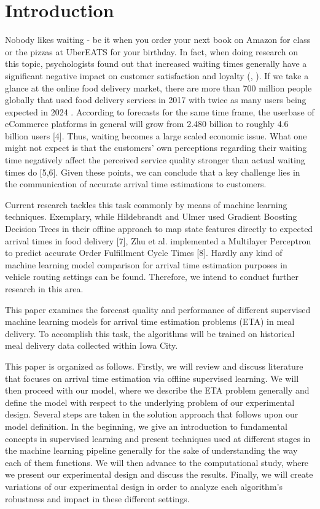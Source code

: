 \chapter{Introduction}

Nobody likes waiting - be it when you order your next book on Amazon for class or the pizzas at UberEATS for your birthday. In fact, when doing research on this topic, psychologists found out that increased waiting times generally have a significant negative impact on customer satisfaction and loyalty (\citealt{WaitingTime1}, \citealt{WaitingTime2}). If we take a glance at the online food delivery market, there are more than 700 million people globally that used food delivery services in 2017 with twice as many users being expected in 2024 \citep{Statista1}. According to forecasts for the same time frame, the userbase of eCommerce platforms in general will grow from 2.480 billion to roughly 4.6 billion users [4]. Thus, waiting becomes a large scaled economic issue. What one might not expect is that the customers’ own perceptions regarding their waiting time negatively affect the perceived service quality stronger than actual waiting times do [5,6]. Given these points, we can conclude that a key challenge lies in the communication of accurate arrival time estimations to customers. 

Current research tackles this task commonly by means of machine learning techniques. Exemplary, while Hildebrandt and Ulmer used Gradient Boosting Decision Trees in their offline approach to map state features directly to expected arrival times in food delivery [7], Zhu et al. implemented a Multilayer Perceptron to predict accurate Order Fulfillment Cycle Times [8]. Hardly any kind of machine learning model comparison for arrival time estimation purposes in vehicle routing settings can be found. Therefore, we intend to conduct further research in this area.  

This paper examines the forecast quality and performance of different supervised machine learning models for arrival time estimation problems (ETA) in meal delivery. To accomplish this task, the algorithms will be trained on historical meal delivery data collected within Iowa City. 

This paper is organized as follows. Firstly, we will review and discuss literature that focuses on arrival time estimation via offline supervised learning. We will then proceed with our model, where we describe the ETA problem generally and define the model with respect to the underlying problem of our experimental design. Several steps are taken in the solution approach that follows upon our model definition. In the beginning, we give an introduction to fundamental concepts in supervised learning and present techniques used at different stages in the machine learning pipeline generally for the sake of understanding the way each of them functions. We will then advance to the computational study, where we present our experimental design and discuss the results. Finally, we will create variations of our experimental design in order to analyze each algorithm’s robustness and impact in these different settings.